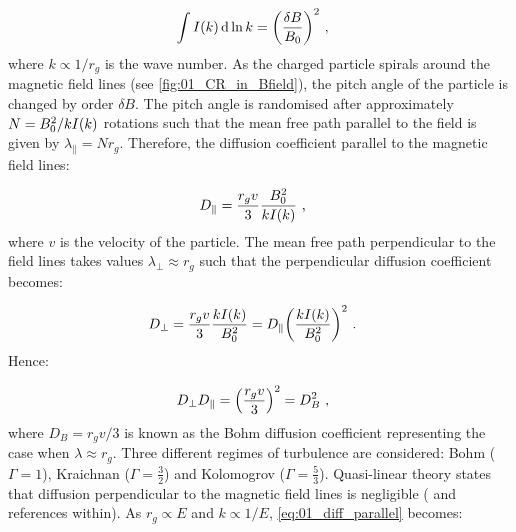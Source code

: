 \begin{equation}
    \begin{aligned}
        \int I\qty(k) \dd{\ln k}&= \qty(\frac{\delta B}{B_0})^2\text{ ,}
    \end{aligned}
\end{equation}
\noindent where $k\propto 1/r_g$ is the wave number. As the charged particle spirals around the magnetic field lines (see \autoref{fig:01_CR_in_Bfield}), the pitch angle of the particle is changed by order $\delta B$. The pitch angle is randomised after approximately $N=B_0^2/kI\qty(k)$ rotations such that the mean free path parallel to the field is given by $\lambda_\parallel=Nr_g$. Therefore, the diffusion coefficient parallel to the magnetic field lines:

\begin{equation}
    \begin{aligned}
        D_\parallel&=\frac{r_gv}{3}\frac{B_0^2}{kI\qty(k)}\text{ ,}
    \end{aligned} \label{eq:01_diff_parallel}
\end{equation}
\noindent where $v$ is the velocity of the particle. The mean free path perpendicular to the field lines takes values $\lambda_\perp\approx r_g$ such that the perpendicular diffusion coefficient becomes:

\begin{equation}
    \begin{aligned}
        D_\perp&=\frac{r_gv}{3}\frac{kI\qty(k)}{B_0^2}=D_\parallel\qty(\frac{kI\qty(k)}{B_0^2})^2\text{ .}
    \end{aligned}
\end{equation}
\noindent Hence:

\begin{equation}
    \begin{aligned}
        D_\perp D_\parallel&=\qty(\frac{r_gv}{3})^2=D_B^2\text{ ,}
    \end{aligned}
\end{equation}
\noindent where $D_B=r_gv/3$ is known as the Bohm diffusion coefficient representing the case when $\lambda\approx r_g$.
\newpar 
Three different regimes of turbulence are considered: Bohm ($\Gamma=1$), Kraichnan ($\Gamma=\frac{3}{2}$) and Kolomogrov ($\Gamma=\frac{5}{3}$). Quasi-linear theory states that diffusion perpendicular to the magnetic field lines is negligible (\cite{2016MNRAS.461.3552N} and references within). As $r_g\propto E$ and $k\propto 1/E$, \autoref{eq:01_diff_parallel} becomes:

